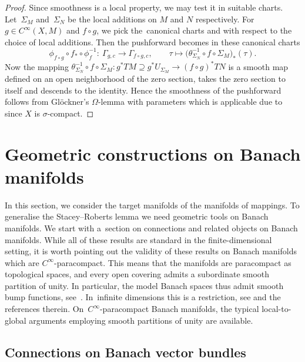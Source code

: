 \begin{proof}
Since smoothness is a local property, we may test it in suitable charts. Let~$\Sigma_M$ and~$\Sigma_N$ be the local additions on $M$ and $N$ respectively. For $g \in C^\infty (X,M)$ and $f \circ g$, we pick the~canonical charts  and  with respect to the choice of local additions. Then the pushforward becomes in these canonical charts
\begin{displaymath}\phi_{f\circ g} \circ f_* \circ \phi^{-1}_f \colon\ \Gamma_{g,c} \rightarrow \Gamma_{f\circ g, c},\qquad \tau \mapsto \bigl(\theta_{\Sigma_N}^{-1} \circ f \circ \Sigma_M\bigr)_*(\tau).\end{displaymath}
Now the mapping $\theta_{\Sigma_N}^{-1} \circ f \circ \Sigma_M \colon g^{\ast}TM \supseteq g^\ast U_{\Sigma_M} \rightarrow (f\circ g)^\ast TN$ is a smooth map defined on an open neighborhood of the zero section, takes the zero section to itself and descends to the identity. Hence the smoothness of the pushforward follows from Gl\"ockner's $\Omega$-lemma with parameters \cite[Theorem~F.23]{glo04} which is applicable due to \cite[Lemma F.19\,(c)]{glo04} since $X$ is $\sigma$-compact.
\end{proof}

\section{Geometric constructions on Banach manifolds}

In this section, we consider the target manifolds of the manifolds of mappings. To generalise the Stacey--Roberts lemma we need geometric tools on Banach manifolds.
We start with a~section on connections and related objects on Banach manifolds.
While all of these results are standard in the finite-dimensional setting, it is worth pointing out the validity of these results on Banach manifolds which are $C^\infty$-paracompact.
This means that the manifolds are paracompact as topological spaces, and every open covering admits a subordinate smooth partition of unity. In particular, the model Banach spaces thus admit smooth bump functions, see~\cite{BaF66}.
In~infinite dimensions this is a restriction, see \cite[Appendix~A.4]{Sch23} and the references therein. On~$C^\infty$-paracompact Banach manifolds, the typical local-to-global arguments employing smooth partitions of unity are available.

\subsection{Connections on Banach vector bundles}

